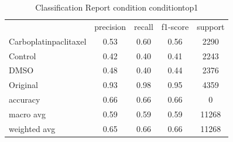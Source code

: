 \begin{table}[htbp]
\centering
\caption{Classification Report condition conditiontop1}
\label{tab:classificationreport.condition.conditiontop1}
\begin{tabular}{lcccc}
 & precision & recall & f1-score & support \\
Carboplatinpaclitaxel & 0.53 & 0.60 & 0.56 & 2290 \\
Control & 0.42 & 0.40 & 0.41 & 2243 \\
DMSO & 0.48 & 0.40 & 0.44 & 2376 \\
Original & 0.93 & 0.98 & 0.95 & 4359 \\
accuracy & 0.66 & 0.66 & 0.66 & 0 \\
macro avg & 0.59 & 0.59 & 0.59 & 11268 \\
weighted avg & 0.65 & 0.66 & 0.66 & 11268 \\
\end{tabular}
\end{table}
